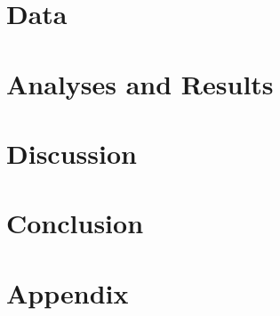\documentclass[12pt]{report}
\begin{document}
\chapter{Data}


\chapter{Analyses and Results}


\chapter{Discussion}


\chapter{Conclusion}


\appendix
\chapter{Appendix}



\setlength{}

\printbibliography[title = References]

\thispagestyle{plain}
\end{document}
